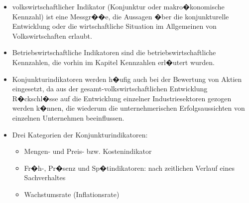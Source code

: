 \begin{itemize}
    \item volkswirtschaftlicher Indikator (Konjunktur oder makro�konomische Kennzahl) ist eine Messgr��e, die Aussagen �ber die konjunkturelle Entwicklung oder die wirtschaftliche Situation im Allgemeinen von Volkswirtschaften erlaubt.

    \item Betriebswirtschaftliche Indikatoren sind die betriebswirtschaftliche Kennzahlen, die vorhin im Kapitel Kennzahlen erl�utert wurden.

    \item Konjunkturindikatoren werden h�ufig auch bei der Bewertung von Aktien eingesetzt, da aus der gesamt-volkswirtschaftlichen Entwicklung R�ckschl�sse auf die Entwicklung einzelner Industriesektoren gezogen werden k�nnen, die wiederum die unternehmerischen Erfolgsaussichten von einzelnen Unternehmen beeinflussen.
 
    \item Drei Kategorien der Konjunkturindikatoren:
    \begin{itemize}
        \item Mengen- und Preis- bzw. Kostenindikator
        \item Fr�h-, Pr�senz und Sp�tindikatoren: nach zeitlichen Verlauf eines Sachverhaltes
		\item Wachstumsrate (Inflationsrate)
    \end{itemize}
\end{itemize}
